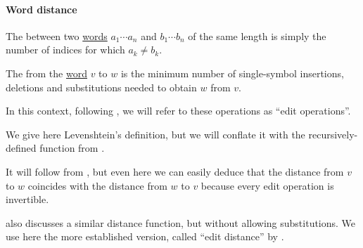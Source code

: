 \paragraph{Word distance}

\begin{definition}\label{def:hamming_distance}
  The  between two \hyperref[def:formal_language/word]{words} \( a_1 \cdots a_n \) and \( b_1 \cdots b_n \) of the same length is simply the number of indices for which \( a_k \neq b_k \).
\end{definition}

\begin{definition}\label{def:levenshtein_distance}
  The  from the \hyperref[def:formal_language/word]{word} \( v \) to \( w \) is the minimum number of single-symbol insertions, deletions and substitutions needed to obtain \( w \) from \( v \).

  In this context, following , we will refer to these operations as \enquote{edit operations}.
\end{definition}
\begin{comments}
  \item We give here Levenshtein's definition, but we will conflate it with the recursively-defined function from .

  \item It will follow from , but even here we can easily deduce that the distance from \( v \) to \( w \) coincides with the distance from \( w \) to \( v \) because every edit operation is invertible.

  \item {} also discusses a similar distance function, but without allowing substitutions. We use here the more established version, called \enquote{edit distance} by .
\end{comments}

